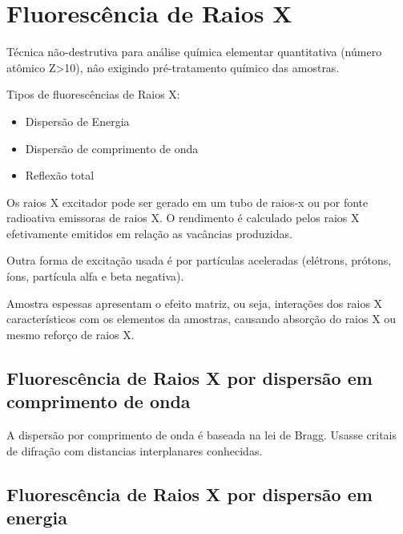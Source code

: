 \section{Fluorescência de Raios X}

Técnica não-destrutiva para análise química elementar 
quantitativa (número atômico Z>10), nâo exigindo pré-tratamento químico das amostras. 


Tipos de fluorescências de Raios X:
\begin{itemize}
  \item Dispersão de Energia
  \item Dispersão de comprimento de onda
  \item Reflexão total
\end{itemize}

Os raios X excitador pode ser gerado em um tubo de raios-x ou por fonte radioativa emissoras de raios X.
O rendimento é calculado pelos raios X efetivamente emitidos em 
relação as vacâncias produzidas.%

Outra forma de excitação usada é por partículas aceleradas 
(elétrons, prótons, íons, partícula alfa e beta negativa).

Amostra espessas apresentam o efeito matriz, ou seja, interações dos 
raios X característicos com os elementos da amostras, causando 
absorção do raios X ou mesmo reforço de raios X.

\subsection{Fluorescência de Raios X por dispersão em comprimento de onda}

A dispersão por comprimento de onda é baseada na lei de Bragg.
Usasse critais de difração com distancias interplanares conhecidas.
  

\subsection{Fluorescência de Raios X por dispersão em energia}

